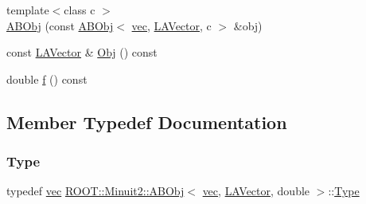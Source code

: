\begin{DoxyCompactItemize}
\item 
{\footnotesize template$<$class c $>$ }\\\mbox{\hyperlink{classROOT_1_1Minuit2_1_1ABObj_3_01vec_00_01LAVector_00_01double_01_4_aeb6018846b4e8252a64eb21db982fe96}{A\+B\+Obj}} (const \mbox{\hyperlink{classROOT_1_1Minuit2_1_1ABObj}{A\+B\+Obj}}$<$ \mbox{\hyperlink{classROOT_1_1Minuit2_1_1vec}{vec}}, \mbox{\hyperlink{classROOT_1_1Minuit2_1_1LAVector}{L\+A\+Vector}}, c $>$ \&obj)
\item 
const \mbox{\hyperlink{classROOT_1_1Minuit2_1_1LAVector}{L\+A\+Vector}} \& \mbox{\hyperlink{classROOT_1_1Minuit2_1_1ABObj_3_01vec_00_01LAVector_00_01double_01_4_a8c53d63141dbfd9b90f73290b895d87a}{Obj}} () const
\item 
double \mbox{\hyperlink{classROOT_1_1Minuit2_1_1ABObj_3_01vec_00_01LAVector_00_01double_01_4_a418f4c2409e7afb1804e3033a7aed2fd}{f}} () const
\end{DoxyCompactItemize}


\subsection{Member Typedef Documentation}
\mbox{\label{classROOT_1_1Minuit2_1_1ABObj_3_01vec_00_01LAVector_00_01double_01_4_a4b4f01cea6a833a82f65ddadd8cb0f40}} 
\subsubsection{\texorpdfstring{Type}{Type}\hspace{0.1cm}{\footnotesize\ttfamily [1/2]}}
{\footnotesize\ttfamily typedef \mbox{\hyperlink{classROOT_1_1Minuit2_1_1vec}{vec}} \mbox{\hyperlink{classROOT_1_1Minuit2_1_1ABObj}{R\+O\+O\+T\+::\+Minuit2\+::\+A\+B\+Obj}}$<$ \mbox{\hyperlink{classROOT_1_1Minuit2_1_1vec}{vec}}, \mbox{\hyperlink{classROOT_1_1Minuit2_1_1LAVector}{L\+A\+Vector}}, double $>$\+::\mbox{\hyperlink{classROOT_1_1Minuit2_1_1ABObj_3_01vec_00_01LAVector_00_01double_01_4_a4b4f01cea6a833a82f65ddadd8cb0f40}{Type}}}

\mbox{\label{classROOT_1_1Minuit2_1_1ABObj_3_01vec_00_01LAVector_00_01double_01_4_a4b4f01cea6a833a82f65ddadd8cb0f40}} 
